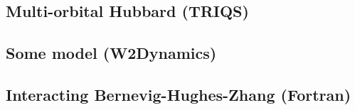 \documentclass[edipack2.tex]{subfiles}
\begin{document}
\subsection{Multi-orbital Hubbard (TRIQS)}

\subsection{Some model (W2Dynamics)}

\subsection{Interacting Bernevig-Hughes-Zhang (Fortran)}
\end{document}
